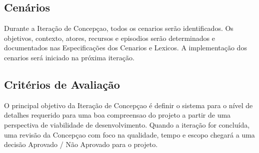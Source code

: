 \subsection{Cenários}

Durante a Iteração de Concepçao, todos os cenarios serão identificados. Os objetivos, contexto, atores, recursos e episodios serão determinados e documentados nas Especificações dos Cenarios e Lexicos. A implementação dos cenarios será iniciado na próxima iteração.

\subsection{Critérios de Avaliação}

O principal objetivo da Iteração de Concepçao é definir o sistema para o nível de detalhes requerido para uma boa compreensao do projeto a partir de uma perspectiva de viabilidade de desenvolvimento. Quando a iteração for concluída, uma revisão da Concepçao com foco na qualidade, tempo e escopo chegará a uma decisão Aprovado / Não Aprovado para o projeto.

